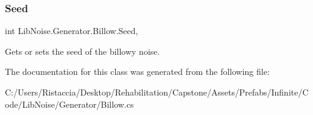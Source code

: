 \subsubsection{\texorpdfstring{Seed}{Seed}}
{\footnotesize\ttfamily int Lib\+Noise.\+Generator.\+Billow.\+Seed\hspace{0.3cm}{\ttfamily [get]}, {\ttfamily [set]}}



Gets or sets the seed of the billowy noise. 



The documentation for this class was generated from the following file\+:\begin{DoxyCompactItemize}
\item 
C\+:/\+Users/\+Ristaccia/\+Desktop/\+Rehabilitation/\+Capstone/\+Assets/\+Prefabs/\+Infinite/\+Code/\+Lib\+Noise/\+Generator/Billow.\+cs\end{DoxyCompactItemize}
